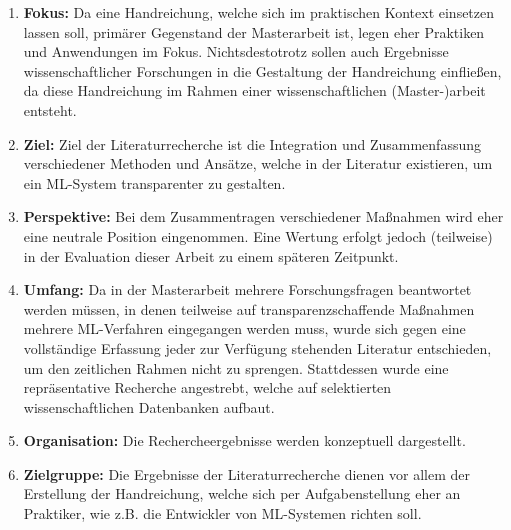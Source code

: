 \begin{enumerate}[label={(\arabic*)}]
    \item \textbf{Fokus:} Da eine Handreichung, welche sich im praktischen Kontext einsetzen lassen soll, primärer Gegenstand der Masterarbeit ist, legen eher Praktiken und Anwendungen im Fokus. Nichtsdestotrotz sollen auch Ergebnisse wissenschaftlicher Forschungen in die Gestaltung der Handreichung einfließen, da diese Handreichung im Rahmen einer wissenschaftlichen (Master-)arbeit entsteht.
    \item \textbf{Ziel:} Ziel der Literaturrecherche ist die Integration und Zusammenfassung verschiedener Methoden und Ansätze, welche in der Literatur existieren, um ein ML-System transparenter zu gestalten.
    \item \textbf{Perspektive:} Bei dem Zusammentragen verschiedener Maßnahmen wird eher eine neutrale Position eingenommen. Eine Wertung erfolgt jedoch (teilweise) in der Evaluation dieser Arbeit zu einem späteren Zeitpunkt.
    \item \textbf{Umfang:} Da in der Masterarbeit mehrere Forschungsfragen beantwortet werden müssen, in denen teilweise auf transparenzschaffende Maßnahmen mehrere ML-Verfahren eingegangen werden muss, wurde sich gegen eine vollständige Erfassung jeder zur Verfügung stehenden Literatur entschieden, um den zeitlichen Rahmen nicht zu sprengen. Stattdessen wurde eine repräsentative Recherche angestrebt, welche auf selektierten wissenschaftlichen Datenbanken aufbaut.
    \item \textbf{Organisation:} Die Rechercheergebnisse werden konzeptuell dargestellt.
    \item \textbf{Zielgruppe:} Die Ergebnisse der Literaturrecherche dienen vor allem der Erstellung der Handreichung, welche sich per Aufgabenstellung eher an Praktiker, wie z.B. die Entwickler von ML-Systemen richten soll.
\end{enumerate}